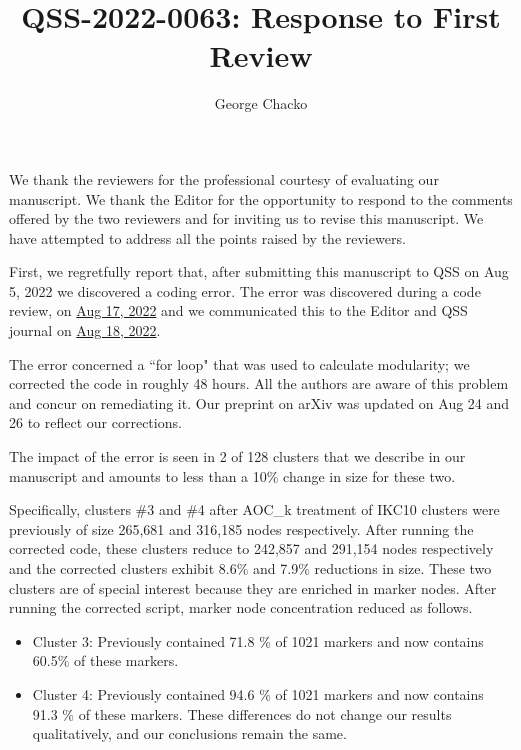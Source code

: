 \documentclass[11pt, oneside]{article}   	%
\title{QSS-2022-0063: Response to First Review}
\author{George Chacko}
\begin{document}
\maketitle
\section*{}

We thank the reviewers for the professional courtesy of evaluating our manuscript. We thank the Editor for the opportunity to respond to the comments 
offered by the two reviewers and for inviting us to revise this manuscript. We have attempted to address all the points raised by the reviewers.

First, we regretfully report that, after submitting this manuscript to QSS on Aug 5, 2022 we discovered a coding error. The error was discovered during a code review,
on \underline{Aug 17, 2022}  and we communicated this to the Editor and QSS journal on \underline{Aug 18, 2022}. 

The error concerned a ``for loop" that was used to calculate modularity; we corrected the code in roughly 48 hours. All the authors are aware of this problem and 
concur on remediating it. Our preprint on arXiv was updated on Aug 24 and 26 to reflect our corrections. 

The impact of the error is seen in 2 of 128 clusters  that we describe in our manuscript and amounts to less than a 10\% change in size for these two.
 
Specifically, clusters \#3 and \#4 after AOC\_k treatment of IKC10 clusters were previously of size 265,681 and 316,185 nodes respectively. After running the corrected code, these
clusters reduce to 242,857 and 291,154 nodes respectively and the corrected clusters exhibit 8.6\% and 7.9\% reductions in size. These two clusters are of special interest because 
they are  enriched in marker nodes. After running the corrected script, marker node concentration reduced as follows. 


\begin{itemize}
\item Cluster 3: Previously contained 71.8 \% of 1021 markers and now contains 60.5\% of these markers.
\item Cluster 4: Previously contained 94.6 \% of 1021 markers and now contains 91.3 \% of these markers. These differences do not change our results qualitatively, and our conclusions remain the same. 
\end{itemize}
\end{document}
